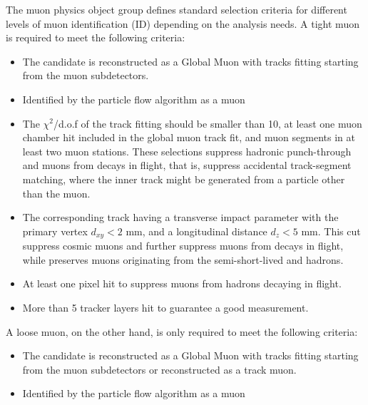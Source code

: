 The muon physics object group defines standard selection criteria for different levels of muon identification (ID) depending on the analysis needs.
A tight muon is required to meet the following criteria:
\begin{itemize}
    \item The candidate is reconstructed as a Global Muon with tracks fitting starting from the muon subdetectors.
   \item Identified by the particle flow algorithm as a muon 
    \item The $\chi^2$/d.o.f of the track fitting should be smaller than 10, at least one muon chamber hit included in the global muon track fit, and muon segments in at least two muon stations.
        These selections suppress hadronic punch-through and muons from decays in flight, that is, suppress accidental track-segment matching, where the inner track might be generated from a particle other than the muon.
    \item The corresponding track having a transverse impact parameter with the primary vertex $d_{xy} < 2$ mm, and a longitudinal distance $d_z < 5$ mm.
        This cut suppress cosmic muons and further suppress muons from decays in flight, while preserves muons originating from the semi-short-lived \PQb and \PQc hadrons.
    \item At least one pixel hit to suppress muons from hadrons decaying in flight.
    \item More than 5 tracker layers hit to guarantee a good \PT measurement.
\end{itemize}

A loose muon, on the other hand, is only required to meet the following criteria:
\begin{itemize}
    \item The candidate is reconstructed as a Global Muon with tracks fitting starting from the muon subdetectors or reconstructed as a track muon.
    \item Identified by the particle flow algorithm as a muon 
\end{itemize}

